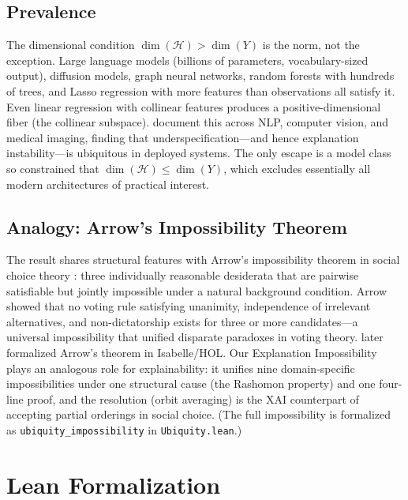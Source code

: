 \documentclass{article}
\newcommand{\sH}{\mathcal{H}}
\begin{document}
\subsection{Prevalence}
\label{sec:prevalence}

The dimensional condition $\dim(\sH) > \dim(Y)$ is the norm, not the
exception.  Large language models (billions of parameters, vocabulary-sized
output), diffusion models, graph neural networks, random forests with
hundreds of trees, and Lasso regression with more features than observations
all satisfy it.  Even linear regression with collinear features produces a
positive-dimensional fiber (the collinear subspace).
\citet{damour2022underspecification} document this across NLP, computer
vision, and medical imaging, finding that underspecification---and hence
explanation instability---is ubiquitous in deployed systems.  The only
escape is a model class so constrained that $\dim(\sH) \leq \dim(Y)$, which
excludes essentially all modern architectures of practical interest.

\subsection{Analogy: Arrow's Impossibility Theorem}
\label{sec:arrow-analogy}

The result shares structural features with Arrow's impossibility theorem in social
choice theory \citep{arrow1951social}: three individually reasonable desiderata
that are pairwise satisfiable but jointly impossible under a natural
background condition.  Arrow showed that no voting rule
satisfying unanimity, independence of irrelevant alternatives, and
non-dictatorship exists for three or more candidates---a universal
impossibility that unified disparate paradoxes in voting theory.
\citet{nipkow2009social} later formalized Arrow's theorem in Isabelle/HOL.
Our Explanation Impossibility plays an analogous role for
explainability: it unifies nine domain-specific impossibilities under one
structural cause (the Rashomon property) and one four-line proof, and the
resolution (orbit averaging) is the XAI counterpart of accepting partial
orderings in social choice.
(The full impossibility is formalized as \texttt{ubiquity\_impossibility}
in \texttt{Ubiquity.lean}.)

\section{Lean Formalization}
\label{sec:lean}
\end{document}

